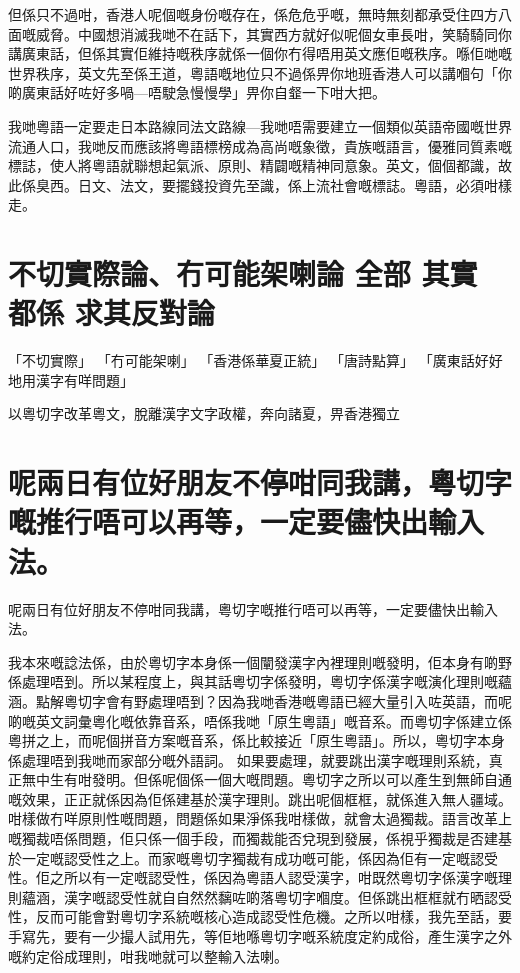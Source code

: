 \documentclass[a5paper, 10pt, openany]{book} %
\begin{document}
但係只不過咁，香港人呢個嘅身份嘅存在，係危危乎嘅，無時無刻都承受住四方八面嘅威脅。中國想消滅我哋不在話下，其實西方就好似呢個女車長咁，笑騎騎同你講廣東話，但係其實佢維持嘅秩序就係一個你冇得唔用英文應佢嘅秩序。喺佢哋嘅世界秩序，英文先至係王道，粵語嘅地位只不過係畀你地班香港人可以講嗰句「你啲廣東話好咗好多喎—唔駛急慢慢學」畀你自韰一下咁大把。

我哋粵語一定要走日本路線同法文路線—我哋唔需要建立一個類似英語帝國嘅世界流通人口，我哋反而應該將粵語標榜成為高尚嘅象徵，貴族嘅語言，優雅同質素嘅標誌，使人將粵語就聯想起氣派、原則、精闢嘅精神同意象。英文，個個都識，故此係臭西。日文、法文，要擺錢投資先至識，係上流社會嘅標誌。粵語，必須咁樣走。

\chapter{不切實際論、冇可能架喇論 全部 其實 都係 求其反對論}
「不切實際」
「冇可能架喇」
「香港係華夏正統」
「唐詩點算」
「廣東話好好地用漢字有咩問題」


以粵切字改革粵文，脫離漢字文字政權，奔向諸夏，畀香港獨立


\chapter{呢兩日有位好朋友不停咁同我講，粵切字嘅推行唔可以再等，一定要儘快出輸入法。}
呢兩日有位好朋友不停咁同我講，粵切字嘅推行唔可以再等，一定要儘快出輸入法。

我本來嘅諗法係，由於粵切字本身係一個闡發漢字內裡理則嘅發明，佢本身有啲野係處理唔到。所以某程度上，與其話粵切字係發明，粵切字係漢字嘅演化理則嘅蘊涵。點解粵切字會有野處理唔到？因為我哋香港嘅粵語已經大量引入咗英語，而呢啲嘅英文詞彙粵化嘅依靠音系，唔係我哋「原生粵語」嘅音系。而粵切字係建立係粵拼之上，而呢個拼音方案嘅音系，係比較接近「原生粵語」。所以，粵切字本身係處理唔到我哋而家部分嘅外語詞。
如果要處理，就要跳出漢字嘅理則系統，真正無中生有咁發明。但係呢個係一個大嘅問題。粵切字之所以可以產生到無師自通嘅效果，正正就係因為佢係建基於漢字理則。跳出呢個框框，就係進入無人疆域。咁樣做冇咩原則性嘅問題，問題係如果淨係我咁樣做，就會太過獨裁。語言改革上嘅獨裁唔係問題，佢只係一個手段，而獨裁能否兌現到發展，係視乎獨裁是否建基於一定嘅認受性之上。而家嘅粵切字獨裁有成功嘅可能，係因為佢有一定嘅認受性。佢之所以有一定嘅認受性，係因為粵語人認受漢字，咁既然粵切字係漢字嘅理則蘊涵，漢字嘅認受性就自自然然黐咗啲落粵切字嗰度。但係跳出框框就冇晒認受性，反而可能會對粵切字系統嘅核心造成認受性危機。之所以咁樣，我先至話，要手寫先，要有一少撮人試用先，等佢地喺粵切字嘅系統度定約成俗，產生漢字之外嘅約定俗成理則，咁我哋就可以整輸入法喇。
\end{document}
